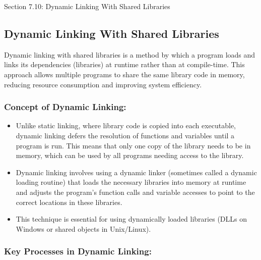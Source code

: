 \begin{notes}{Section 7.10: Dynamic Linking With Shared Libraries}
    \subsection*{Dynamic Linking With Shared Libraries}

    Dynamic linking with shared libraries is a method by which a program loads and links its dependencies (libraries) at runtime rather than at compile-time. This approach allows multiple programs to 
    share the same library code in memory, reducing resource consumption and improving system efficiency. \vspace*{1em}
    
    \subsubsection*{Concept of Dynamic Linking:}
    
    \begin{itemize}
        \item Unlike static linking, where library code is copied into each executable, dynamic linking defers the resolution of functions and variables until a program is run. This means that only 
        one copy of the library needs to be in memory, which can be used by all programs needing access to the library.
        \item Dynamic linking involves using a dynamic linker (sometimes called a dynamic loading routine) that loads the necessary libraries into memory at runtime and adjusts the program's function 
        calls and variable accesses to point to the correct locations in these libraries.
        \item This technique is essential for using dynamically loaded libraries (DLLs on Windows or shared objects in Unix/Linux).
    \end{itemize}
    
    \subsubsection*{Key Processes in Dynamic Linking:}
    

\end{notes}
